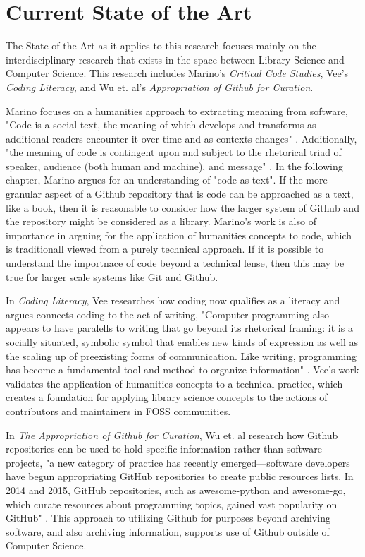 \section{Current State of the Art}
\label{sec:stateofart}

The State of the Art as it applies to this research focuses mainly on the interdisciplinary research that exists in the space between Library Science and Computer Science. This research includes Marino's \textit{Critical Code Studies}, Vee's \textit{Coding Literacy}, and Wu et. al's \textit{Appropriation of Github for Curation}.  

Marino focuses on a humanities approach to extracting meaning from software, "Code is a social text, the meaning of which develops and transforms as additional readers encounter it over time and as contexts changes" \cite{marino2020critical}. Additionally, "the meaning of code is contingent upon and subject to the rhetorical triad of speaker, audience (both human and machine), and message" \cite{marino2020critical}. In the following chapter, Marino argues for an understanding of "code as text". If the more granular aspect of a Github repository that is code can be approached as a text, like a book, then it is reasonable to consider how the larger system of Github and the repository might be considered as a library. Marino's work is also of importance in arguing for the application of humanities concepts to code, which is traditionall viewed from a purely technical approach. If it is possible to understand the importnace of code beyond a technical lense, then this may be true for larger scale systems like Git and Github. 

In \textit{Coding Literacy}, Vee researches how coding now qualifies as a literacy and argues connects coding to the act of writing, "Computer programming also appears to have paralells to writing that go beyond its rhetorical framing: it is a socially situated, symbolic symbol that enables new kinds of expression as well as the scaling up of preexisting forms of communication. Like writing, programming has become a fundamental tool and method to organize information" \cite{vee2017coding}. Vee's work validates the application of humanities concepts to a technical practice, which creates a foundation for applying library science concepts to the actions of contributors and maintainers in FOSS communities. 

In \textit{The Appropriation of Github for Curation}, Wu et. al research how Github repositories can be used to hold specific information rather than software projects, "a new category of practice has recently emerged—software developers have begun appropriating GitHub repositories to create public resources lists. In 2014 and 2015, GitHub repositories, such as awesome-python and awesome-go, which curate resources about programming topics, gained vast popularity on GitHub" \cite{wu2017github}. This approach to utilizing Github for purposes beyond archiving software, and also archiving information, supports use of Github outside of Computer Science. 

